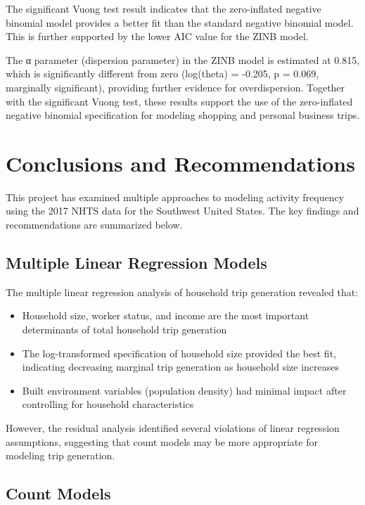 \documentclass[12pt]{article}
\begin{document}
The significant Vuong test result indicates that the zero-inflated negative binomial model provides a better fit than the standard negative binomial model. This is further supported by the lower AIC value for the ZINB model.

The α parameter (dispersion parameter) in the ZINB model is estimated at 0.815, which is significantly different from zero (log(theta) = -0.205, p = 0.069, marginally significant), providing further evidence for overdispersion. Together with the significant Vuong test, these results support the use of the zero-inflated negative binomial specification for modeling shopping and personal business trips.

\section{Conclusions and Recommendations}

This project has examined multiple approaches to modeling activity frequency using the 2017 NHTS data for the Southwest United States. The key findings and recommendations are summarized below.

\subsection{Multiple Linear Regression Models}

The multiple linear regression analysis of household trip generation revealed that:
\begin{itemize}
    \item Household size, worker status, and income are the most important determinants of total household trip generation
    \item The log-transformed specification of household size provided the best fit, indicating decreasing marginal trip generation as household size increases
    \item Built environment variables (population density) had minimal impact after controlling for household characteristics
\end{itemize}

However, the residual analysis identified several violations of linear regression assumptions, suggesting that count models may be more appropriate for modeling trip generation.

\subsection{Count Models}
\end{document}
